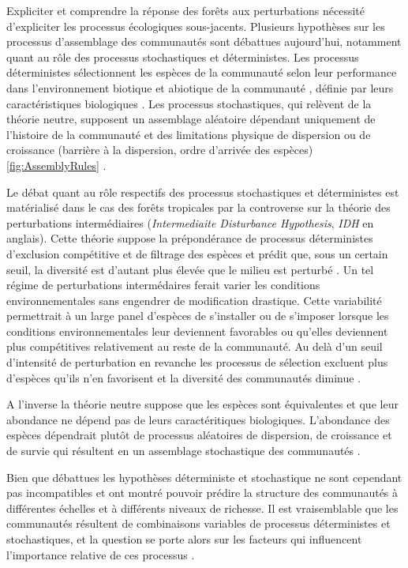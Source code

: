 \documentclass[
  11pt,
  french,
  A4paper,
  extrafontsizes,onecolumn,openright
  ]{memoir}
\begin{document}
Expliciter et comprendre la réponse des forêts aux perturbations
nécessité d'expliciter les processus écologiques sous-jacents. Plusieurs
hypothèses sur les processus d'assemblage des communautés sont débattues
aujourd'hui, notamment quant au rôle des processus stochastiques et
déterministes. Les processus déterministes sélectionnent les espèces de
la communauté selon leur performance dans l'environnement biotique et
abiotique de la communauté , définie par leurs caractéristiques
biologiques \autocite{Molino2001}. Les processus stochastiques, qui
relèvent de la théorie neutre, supposent un assemblage aléatoire
dépendant uniquement de l'histoire de la communauté et des limitations
physique de dispersion ou de croissance (barrière à la dispersion, ordre
d'arrivée des espèces) \ref{fig:AssemblyRules} \autocite{Hubbell2001}.

Le débat quant au rôle respectifs des processus stochastiques et
déterministes est matérialisé dans le cas des forêts tropicales par la
controverse sur la théorie des perturbations intermédiaires
(\emph{Intermediaite Disturbance Hypothesis}, \emph{IDH} en anglais).
Cette théorie suppose la prépondérance de processus déterministes
d'exclusion compétitive et de filtrage des espèces et prédit que, sous
un certain seuil, la diversité est d'autant plus élevée que le milieu
est perturbé \autocite{Molino2001}. Un tel régime de perturbations
intermédaires ferait varier les conditions environnementales sans
engendrer de modification drastique. Cette variabilité permettrait à un
large panel d'espèces de s'installer ou de s'imposer lorsque les
conditions environnementales leur deviennent favorables ou qu'elles
deviennent plus compétitives relativement au reste de la communauté. Au
delà d'un seuil d'intensité de perturbation en revanche les processus de
sélection excluent plus d'espèces qu'ils n'en favorisent et la diversité
des communautés diminue
\autocites{Chesson2000}{Kariuki2006a}{Berry2008a}.

A l'inverse la théorie neutre suppose que les espèces sont équivalentes
et que leur abondance ne dépend pas de leurs caractéritiques
biologiques. L'abondance des espèces dépendrait plutôt de processus
aléatoires de dispersion, de croissance et de survie qui résultent en un
assemblage stochastique des communautés \autocite{Hubbell2001}.

Bien que débattues les hypothèses déterministe et stochastique ne sont
cependant pas incompatibles et ont montré pouvoir prédire la structure
des communautés à différentes échelles et à différents niveaux de
richesse. Il est vraisemblable que les communautés résultent de
combinaisons variables de processus déterministes et stochastiques, et
la question se porte alors sur les facteurs qui influencent l'importance
relative de ces processus \autocite{Chave2004}.
\end{document}
